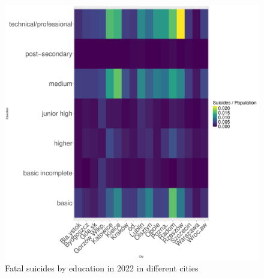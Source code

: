 \documentclass{article}
\begin{document}
\begin{figure}[H]
\begin{minipage}{0.45\textwidth}
        \includegraphics[width=\textwidth]{imgs/education_city_op-fat-2022.pdf}
        \caption{Fatal suicides by education  in 2022 in different cities}
	\label{fig:education_city_op-fat-2022}
    \end{minipage}
\end{figure}
\end{document}
